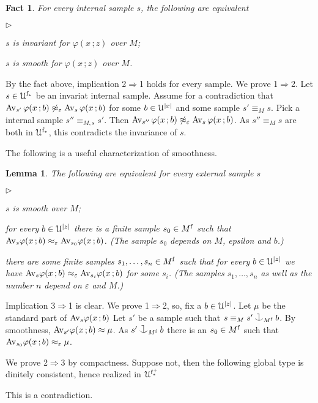 \documentclass[10pt,openany]{article}
\newcommand{\mylabel}[1]{{\ssf{#1}}\hfill}
\renewenvironment{itemize}
  {\begin{list}{$\triangleright$}{%
   \setlength{\parskip}{0mm}
   \setlength{\topsep}{.4\baselineskip}
   \setlength{\rightmargin}{0mm}
   \setlength{\listparindent}{0mm}
   \setlength{\itemindent}{0mm}
   \setlength{\labelwidth}{3ex}
   \setlength{\itemsep}{.4\baselineskip}
   \setlength{\parsep}{0mm}
   \setlength{\partopsep}{0mm}
   \setlength{\labelsep}{1ex}
   \setlength{\leftmargin}{\labelwidth+\labelsep}
   \let\makelabel\mylabel}}{%
   \end{list}\vspace*{-\parskip}}
\def\cnonfork{\mathbin{\raise1.8ex\rlap{\kern0.6ex\rule{0.6ex}{0.1ex}}
\rlap{\kern1.1ex\rule{0.1ex}{1.9ex}}\raise-0.3ex\hbox{$\smile$} } }
\def\IMP{\Rightarrow}
\def\U{\EuScript U}
\def\phi{\varphi}
\def\epsilon{\varepsilon}
\def\ssf#1{\textsf{\small #1}}
\newcounter{thm}[section]
\theoremstyle{mio}
\newtheorem{lemma}[thm]{Lemma}
\newtheorem{fact}[thm]{Fact}
\theoremstyle{liscio}
\def\QED{\noindent\nolinebreak[4]\hspace{\stretch{1}}\rlap{\ \ $\Box$}\medskip}
\renewenvironment{proof}[1][Proof]%
{\begin{trivlist}\item[\hskip\labelsep {\bf #1}]}
{\QED\end{trivlist}}
\begin{document}
\begin{fact}
  For every internal sample $s$, the following are equivalent
  \begin{itemize}
    \item[1.] $s$ is invariant for $\phi(x\,;z)$ over $M$;
    \item[2.] $s$ is smooth for $\phi(x\,;z)$ over $M$.
  \end{itemize}
\end{fact}

\begin{proof}
  By the fact above, implication \ssf{2}$\IMP$\ssf{1} holds for every sample.
  We prove \ssf{1}$\IMP$\ssf{2}.
  Let $s\in\U^{\rm f_*}$ be an invariat internal sample.
  Assume for a contradiction that $\Av_{s'}\,\phi(x\,;b)\not\approx_\epsilon\Av_{s}\,\phi(x\,;b)$ for some $b\in\U^{|x|}$ and some sample $s'\equiv_M s$.
  Pick a internal sample $s''\equiv_{M,s}s'$. 
  Then $\Av_{s''}\,\phi(x\,;b)\not\approx_\epsilon\Av_{s}\,\phi(x\,;b)$.
  As $s''\equiv_Ms$ are both in $\U^{\rm f_*}$, this contradicts the invariance of $s$.
\end{proof}

The following is a useful characterization of smoothness.

\begin{lemma}
  The following are equivalent for every external sample $s$
  \begin{itemize}
    \item[1.] $s$ is smooth over $M$;
    \item[2.] for every $b\in\U^{|z|}$ there is a finite sample $s_0\in M^{\rm f}$ such that $\Av_s\phi(x\,;b)\approx_\epsilon\Av_{s_0}\phi(x\,;b)$. (The sample $s_0$ depends on $M$, epsilon and $b$.)
    \item[3.] there are some finite samples $s_1,\dots,s_n\in M^{\rm f}$ such that for every $b\in\U^{|z|}$ we have $\Av_s\phi(x\,;b)\approx_\epsilon\Av_{s_i}\phi(x\,;b)$ for some $s_i$. (The samples $s_1,\dots,s_n$ as well as the number $n$ depend on $\epsilon$ and $M$.)
  \end{itemize}
\end{lemma}

\begin{proof}
  Implication \ssf{3}$\IMP$\ssf{1} is clear.
  We prove \ssf{1}$\IMP$\ssf{2}, so, fix a $b\in\U^{|z|}$.
  Let $\mu$ be the standard part of $\Av_s\phi(x\,;b)$
  Let $s'$ be a sample such that $s\equiv_Ms'\cnonfork_{M^{\rm f}}b$.
  By smoothness, $\Av_{s'}\phi(x\,;b)\approx\mu$.
  As $s'\cnonfork_{M^{\rm f}}b$ there is an $s_0\in M^{\rm f}$ such that $\Av_{s_0}\phi(x\,;b )\approx_\epsilon\mu$.

  We prove \ssf{2}$\IMP$\ssf{3} by compactness.
  Suppose not, then the following global type is dinitely consistent, hence realized in $\U^{\rm f^+_*}$

\ceq{\hfill p(y)}{=}{\Big\{\Av_y\phi(x,b)\not\approx_\epsilon\Av_{s_0}\phi(x\,;b)\ :\  s_0\in M^{\rm f},\ b\in\U^{|z|}\Big\}}

This is a contradiction.
\end{proof}
\end{document}
